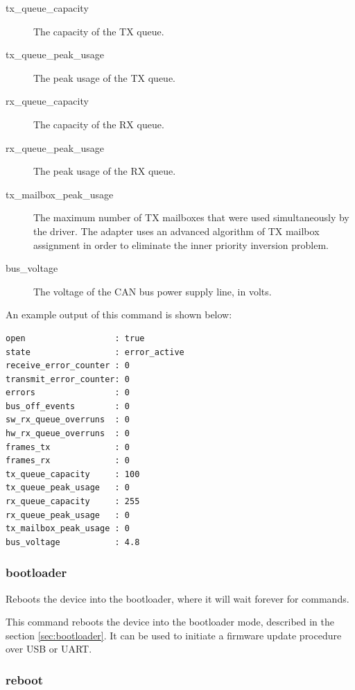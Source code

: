 \documentclass{zubaxdoc}
\begin{document}
\begin{description}
    \item[tx\_queue\_capacity] The capacity of the TX queue.

    \item[tx\_queue\_peak\_usage] The peak usage of the TX queue.

    \item[rx\_queue\_capacity] The capacity of the RX queue.

    \item[rx\_queue\_peak\_usage] The peak usage of the RX queue.

    \item[tx\_mailbox\_peak\_usage] The maximum number of TX mailboxes that were used simultaneously by the driver.
                                    The adapter uses an advanced algorithm of TX mailbox assignment in order to
                                    eliminate the inner priority inversion problem.

    \item[bus\_voltage] The voltage of the CAN bus power supply line, in volts.
\end{description}

An example output of this command is shown below:

\begin{verbatim}
open                  : true
state                 : error_active
receive_error_counter : 0
transmit_error_counter: 0
errors                : 0
bus_off_events        : 0
sw_rx_queue_overruns  : 0
hw_rx_queue_overruns  : 0
frames_tx             : 0
frames_rx             : 0
tx_queue_capacity     : 100
tx_queue_peak_usage   : 0
rx_queue_capacity     : 255
rx_queue_peak_usage   : 0
tx_mailbox_peak_usage : 0
bus_voltage           : 4.8
\end{verbatim}

\subsubsection{bootloader}

Reboots the device into the bootloader, where it will wait forever for commands.

This command reboots the device into the bootloader mode, described in the section \ref{sec:bootloader}.
It can be used to initiate a firmware update procedure over USB or UART.

\subsubsection{reboot}
\end{document}
